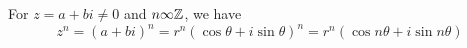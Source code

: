\begin{theorem}
    For $z = a + b i \neq 0$ and $n \infty \mathbb{Z}$, we have 
    \begin{equation}
        z^n = (a+bi)^n = r^n(\cos \theta + i \sin \theta)^n = r^n (\cos n\theta + i \sin n\theta)
    \end{equation}
\end{theorem}








































































































